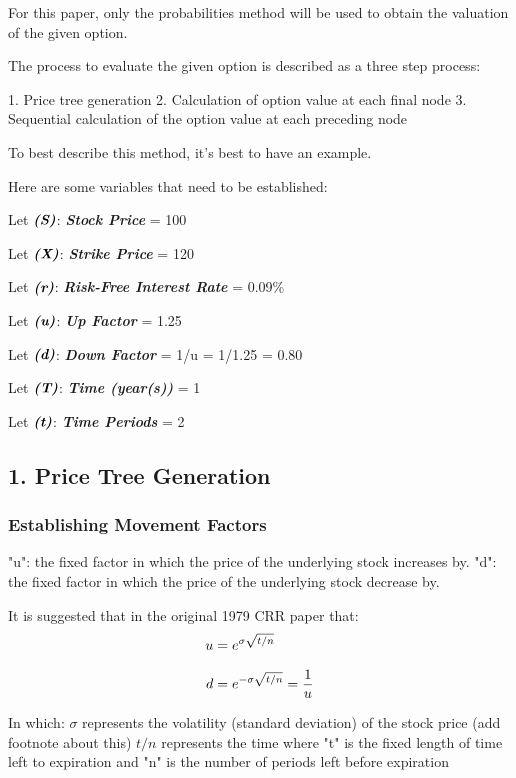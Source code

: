 \documentclass[12pt, letterpaper]{article}
\begin{document}
For this paper, only the probabilities method will be used to obtain the valuation of the given option. 

The process to evaluate the given option is described as a three step process: %

1. Price tree generation
2. Calculation of option value at each final node
3. Sequential calculation of the option value at each preceding node

To best describe this method, it's best to have an example.

Here are some variables that need to be established:

Let ${\textit{\textbf{(S)}}}$: \textit{\textbf{Stock Price}} = 100

Let ${\textit{\textbf{(X)}}}$: \textit{\textbf{Strike Price}} = 120

Let ${\textit{\textbf{(r)}}}$: \textit{\textbf{Risk-Free Interest Rate}} = 0.09\%

Let ${\textit{\textbf{(u)}}}$: \textit{\textbf{Up Factor}} = 1.25

Let ${\textit{\textbf{(d)}}}$: \textit{\textbf{Down Factor}} = 1/u = 1/1.25 = 0.80

Let ${\textit{\textbf{(T)}}}$: \textit{\textbf{Time (year(s))}}  = 1

Let ${\textit{\textbf{(t)}}}$: \textit{\textbf{Time Periods}}  = 2 

\pagebreak
\subsection*{1. Price Tree Generation}
\subsubsection*{Establishing Movement Factors}
"u": the fixed factor in which the price of the underlying stock increases by.
"d": the fixed factor in which the price of the underlying stock decrease by.

It is suggested that in the original 1979 CRR paper that:
\begin{equation*}
  \setlength{\jot}{10pt}
  \begin{split}
    u
    & = e^{\sigma\sqrt{t/n}}
    \\
    d
    & = e^{-\sigma\sqrt{t/n}} = \frac{1}{u}
  \end{split}
\end{equation*}

In which:
${\sigma}$ represents the volatility (standard deviation) of the stock price (add footnote about this) %
${t/n}$ represents the time where "t" is the fixed length of time left to expiration and "n" is the number of periods left before expiration
\end{document}
